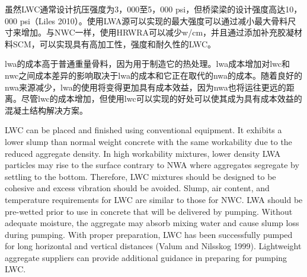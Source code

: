 虽然LWC通常设计抗压强度为3，000至5，000 psi，但桥梁梁的设计强度高达10，000 psi（Liles 2010）。使用LWA源可以实现的最大强度可以通过减小最大骨料尺寸来增加。与NWC一样，使用HRWRA可以减少w/cm，并且通过添加补充胶凝材料SCM，可以实现具有高加工性，强度和耐久性的LWC。

\acrlong*{lwa}的成本高于普通重量骨料，因为用于制造它的热处理。\acrlong*{lwa}成本增加对\acrlong*{lwc}和\acrlong*{nwc}之间成本差异的影响取决于\acrlong*{lwa}的成本和它正在取代的\acrlong*{nwa}的成本。随着良好的\acrlong*{nwa}来源减少，\acrlong*{lwa}的使用将变得更加具有成本效益，因为\acrlong*{nwa}也将运往更远的距离。尽管\acrlong*{lwc}的成本增加，但使用\acrlong*{lwc}可以实现的好处可以使其成为具有成本效益的混凝土结构解决方案。


LWC can be placed and finished using conventional equipment. It exhibits a lower slump than normal weight concrete with the same workability due to the reduced aggregate density. In high workability mixtures, lower density LWA particles may rise to the surface contrary to NWA where aggregates segregate by settling to the bottom.  Therefore, LWC mixtures should be designed to be cohesive and excess vibration should be avoided. Slump, air content, and temperature requirements for LWC are similar to those for NWC. LWA should be pre-wetted prior to use in concrete that will be delivered by pumping. Without adequate moisture, the aggregate may absorb mixing water and cause slump loss during pumping. With proper preparation, LWC has been successfully pumped for long horizontal and vertical distances (Valum and Nilsskog 1999). Lightweight aggregate suppliers can provide additional guidance in preparing for pumping LWC.

